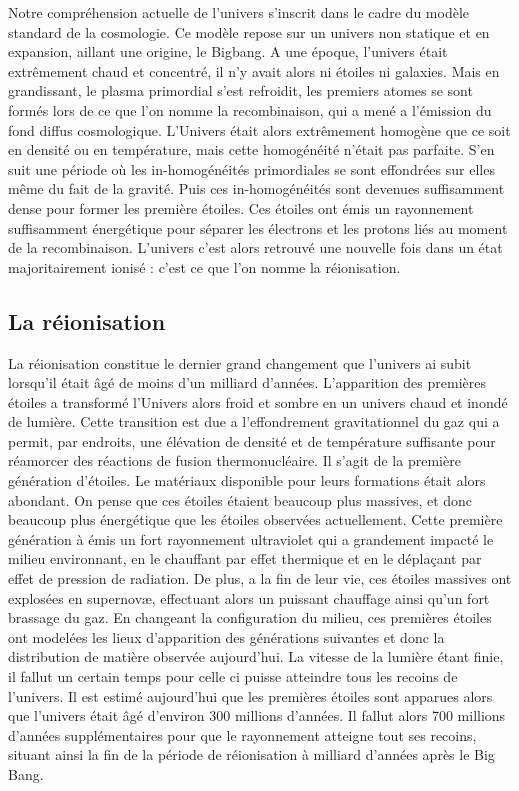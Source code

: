 Notre compréhension actuelle de l'univers s'inscrit dans le cadre du modèle standard de la cosmologie.
Ce modèle repose sur un univers non statique et en expansion, aillant une origine, le Bigbang.
A une époque, l'univers était extrêmement chaud et concentré, il n'y avait alors ni étoiles ni galaxies.
Mais en grandissant, le plasma primordial s'est refroidit, les premiers atomes se sont formés lors de ce que l'on nomme la recombinaison, qui a mené a l'émission du fond diffus cosmologique.
L'Univers était alors extrêmement homogène que ce soit en densité ou en température, mais cette homogénéité n'était pas parfaite.
S'en suit une période où les in-homogénéités primordiales se sont effondrées sur elles même du fait de la gravité.
Puis ces in-homogénéités sont devenues suffisamment dense pour former les première étoiles.
Ces étoiles ont émis un rayonnement suffisamment énergétique pour séparer les électrons et les protons liés au moment de la recombinaison.
L'univers c'est alors retrouvé une nouvelle fois dans un état majoritairement ionisé : c'est ce que l'on nomme la réionisation.

\subsection*{La réionisation}
La réionisation constitue le dernier grand changement que l'univers ai subit lorsqu'il était âgé de moins d'un milliard d'années.
L'apparition des premières étoiles a transformé l'Univers alors froid et sombre en un univers chaud et inondé de lumière.
Cette transition est due a l'effondrement gravitationnel du gaz qui a permit, par endroits, une élévation de densité et de température suffisante pour réamorcer des réactions de fusion thermonucléaire.
Il s'agit de la première génération d'étoiles.
Le matériaux disponible pour leurs formations était alors abondant.
On pense que ces étoiles étaient beaucoup plus massives, et donc beaucoup plus énergétique que les étoiles observées actuellement.
Cette première génération à émis un fort rayonnement ultraviolet qui a grandement impacté le milieu environnant, en le chauffant par effet thermique et en le déplaçant par effet de pression de radiation.
De plus, a la fin de leur vie, ces étoiles massives ont explosées en supernovæ, effectuant alors un puissant chauffage ainsi qu'un fort brassage du gaz.
En changeant la configuration du milieu, ces premières étoiles ont modelées les lieux d'apparition des générations suivantes et donc la distribution de matière observée aujourd'hui.
La vitesse de la lumière étant finie, il fallut un certain temps pour celle ci puisse atteindre tous les recoins de l'univers. Il est estimé aujourd'hui que les premières étoiles sont apparues alors que l'univers était âgé d'environ 300 millions d'années. 
Il fallut alors 700 millions d'années supplémentaires pour que le rayonnement atteigne tout ses recoins, situant ainsi la fin de la période de réionisation à milliard d'années après le Big Bang.

